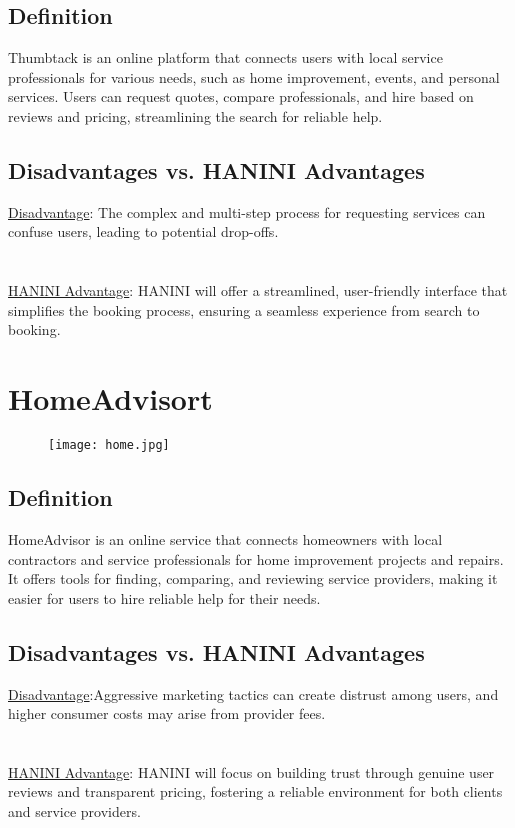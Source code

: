 \documentclass[12pt,a4paper]{report}
\begin{document}
\subsection*{Definition}
Thumbtack is an online platform that connects users with local service professionals for various needs, such as home improvement, events, and personal services. Users can request quotes, compare professionals, and hire based on reviews and pricing, streamlining the search for reliable help.
\subsection*{Disadvantages vs. HANINI Advantages}
\underline {Disadvantage}: The complex and multi-step process for requesting services can confuse users, leading to potential drop-offs.\\
\textbf{                      }\\
\textbf{                      }\\
\underline {HANINI Advantage}: HANINI will offer a streamlined, user-friendly interface that simplifies the booking process, ensuring a seamless experience from search to booking.


\section{HomeAdvisort}
\begin{figure}[ht]
    \begin{center}
        \texttt{[image: home.jpg]}
         
     \end{center}
\end{figure}
\subsection*{Definition}
HomeAdvisor is an online service that connects homeowners with local contractors and service professionals for home improvement projects and repairs. It offers tools for finding, comparing, and reviewing service providers, making it easier for users to hire reliable help for their needs.
\subsection*{Disadvantages vs. HANINI Advantages}
\underline {Disadvantage}:Aggressive marketing tactics can create distrust among users, and higher consumer costs may arise from provider fees.\\
\textbf{                      }\\
\textbf{                      }\\
\underline {HANINI Advantage}:  HANINI will focus on building trust through genuine user reviews and transparent pricing, fostering a reliable environment for both clients and service providers.
\end{document}
